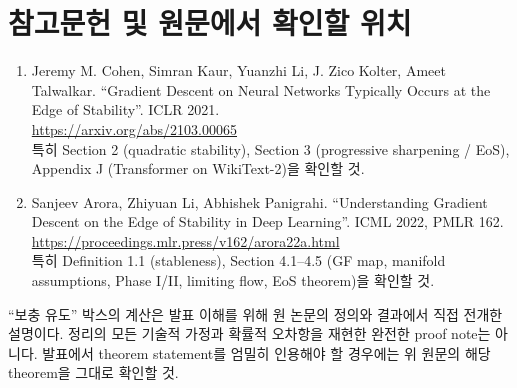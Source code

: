 \documentclass[11pt,a4paper,oneside,openany]{memoir}
\theoremstyle{definition}
\begin{document}
\chapter*{참고문헌 및 원문에서 확인할 위치}

\begin{enumerate}
  \item Jeremy M. Cohen, Simran Kaur, Yuanzhi Li, J. Zico Kolter, Ameet Talwalkar.
  ``Gradient Descent on Neural Networks Typically Occurs at the Edge of Stability''.
  ICLR 2021.\\
  \url{https://arxiv.org/abs/2103.00065}\\
  특히 Section 2 (quadratic stability), Section 3 (progressive sharpening / EoS),
  Appendix J (Transformer on WikiText-2)을 확인할 것.

  \item Sanjeev Arora, Zhiyuan Li, Abhishek Panigrahi.
  ``Understanding Gradient Descent on the Edge of Stability in Deep Learning''.
  ICML 2022, PMLR 162.\\
  \url{https://proceedings.mlr.press/v162/arora22a.html}\\
  특히 Definition 1.1 (stableness), Section 4.1--4.5 (GF map, manifold assumptions,
  Phase I/II, limiting flow, EoS theorem)을 확인할 것.
\end{enumerate}

\begin{warningbox}
``보충 유도'' 박스의 계산은 발표 이해를 위해 원 논문의 정의와 결과에서 직접 전개한 설명이다.
정리의 모든 기술적 가정과 확률적 오차항을 재현한 완전한 proof note는 아니다.
발표에서 theorem statement를 엄밀히 인용해야 할 경우에는 위 원문의 해당 theorem을 그대로 확인할 것.
\end{warningbox}
\end{document}
